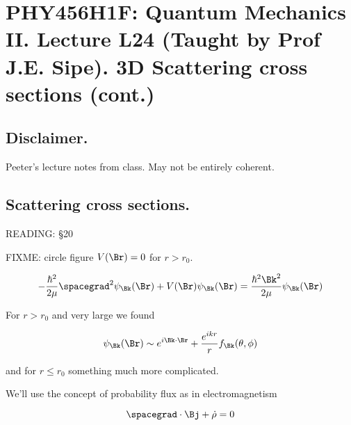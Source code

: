 
%

%
%
%

\chapter{PHY456H1F: Quantum Mechanics II.  Lecture L24 (Taught by Prof J.E. Sipe).  3D Scattering cross sections (cont.)}
\label{chap:qmTwoL24}
{}
\date{Dec 5, 2011}

\beginArtWithToc

\section{Disclaimer.}

Peeter's lecture notes from class.  May not be entirely coherent.

\section{Scattering cross sections.}

READING: \S 20 \cite{desai2009quantum}

FIXME: circle figure $V(\Br) = 0$ for $r > r_0$.

\begin{equation}\label{eqn:qmTwoL24:n}
-\frac{\hbar^2}{2\mu} \spacegrad^2 
\psi_\Bk(\Br)
+ V(\Br)
\psi_\Bk(\Br)
= 
\frac{\hbar^2 \Bk^2}{2 \mu}
\psi_\Bk(\Br)
\end{equation}

For $r > r_0$ and very large we found 

\begin{equation}\label{eqn:qmTwoL24:n}
\psi_\Bk(\Br) \sim e^{i \Bk \cdot \Br} + \frac{e^{i k r}}{r} f_\Bk(\theta, \phi)
\end{equation}

and for $r \le r_0$ something much more complicated.

We'll use the concept of probability flux as in electromagnetism

\begin{equation}\label{eqn:qmTwoL24:n}
\spacegrad \cdot \Bj + \dot{\rho} = 0
\end{equation}

